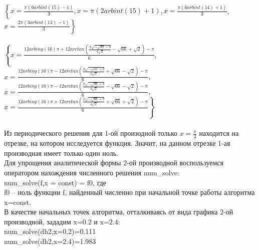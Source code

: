\documentclass[russian,utf8,nocolumnxxxi,nocolumnxxxii]{eskdtext}
\begin{document}
\\
$\left\{x=\frac{\pi(6arbint(15)-1)}{3}, x=\pi(2arbint(15)+1), x=\frac{\pi(6arbint(14)+1)}{3}\right.$,\\ $\left.x=\frac{2\pi(3arbint(14)-1)}{3}\right\}$
\\
\\
$\left\{x=\frac{12arbing(16)\pi+12arctan(\frac{2\sqrt{-\sqrt{33}+9}}{4\sqrt{2}}-\sqrt{66}+\sqrt{2})-\pi}{6}\right.$,\\
$x=\frac{12arbing(16)\pi-12arctan(\frac{2\sqrt{-\sqrt{33}+9}}{4\sqrt{2}}+\sqrt{66}-\sqrt{2})-\pi}{6}$,$x=\frac{12arbing(16)\pi-12arctan(\frac{2\sqrt{-\sqrt{33}+9}}{4\sqrt{2}}-\sqrt{66}-\sqrt{2})-\pi}{6}$,\\
$\left.x=\frac{12arbing(16)\pi+12arctan(\frac{2\sqrt{-\sqrt{33}+9}}{4\sqrt{2}}+\sqrt{66}+\sqrt{2})-\pi}{6}\right\}$\\
\\
Из периодического решения для 1-ой произодной только $x=\frac{\pi}{3}$ находится на отрезке, на котором исследуется функция. Значит, на данном отрезке 1-ая производная имеет только один ноль.\\
Для упрощения аналитической формы 2-ой производной воспользуемся оператором нахождения численного решения num\_solve:\\
num\_solve(f,x = const) = f0, где\\
f0 – ноль функции f, найденный численно при начальной точке работы алгоритма x=const.\\
В качестве начальных точек алгоритма, отталкиваясь от вида графика 2-ой производной, зададим x=0.2 и x=2.4:\\
num\_solve(dh2,x=0.2)=0.111\\
num\_solve(dh2,x=2.4)=1.983\\
\end{document}
